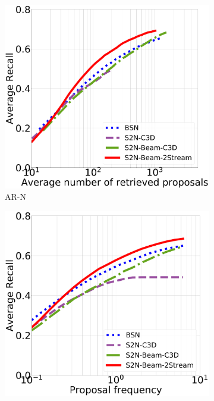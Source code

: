 \documentclass[10pt,journal,compsoc]{IEEEtran}
\begin{document}
\begin{figure}[t]
\centering
    
    \begin{subfigure}[b]{0.24\textwidth}
   	\includegraphics[width=\textwidth]{figures/results/S2N-Beam-2Stream_avg_recall.pdf}
    \caption{AR-N}
   \end{subfigure}
   \begin{subfigure}[b]{0.24\textwidth}
   	\includegraphics[width=\textwidth]{figures/results/S2N-Beam-2Stream_freq.pdf}

\end{subfigure}
\end{figure}
\end{document}
